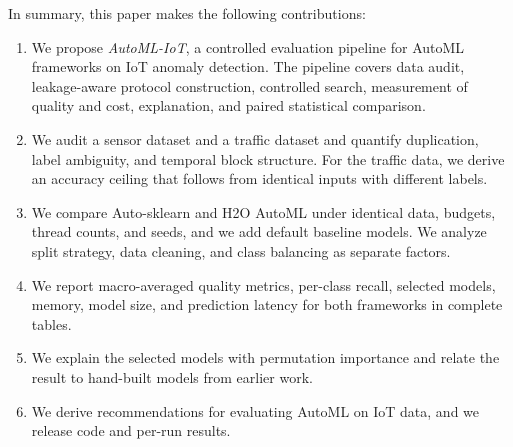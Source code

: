In summary, this paper makes the following contributions:
\begin{enumerate}
\item[(1)] We propose \emph{AutoML-IoT}, a controlled evaluation pipeline for AutoML frameworks on IoT anomaly detection. The pipeline covers data audit, leakage-aware protocol construction, controlled search, measurement of quality and cost, explanation, and paired statistical comparison.
\item[(2)] We audit a sensor dataset and a traffic dataset and quantify duplication, label ambiguity, and temporal block structure. For the traffic data, we derive an accuracy ceiling that follows from identical inputs with different labels.
\item[(3)] We compare Auto-sklearn and H2O AutoML under identical data, budgets, thread counts, and seeds, and we add default baseline models. We analyze split strategy, data cleaning, and class balancing as separate factors.
\item[(4)] We report macro-averaged quality metrics, per-class recall, selected models, memory, model size, and prediction latency for both frameworks in complete tables.
\item[(5)] We explain the selected models with permutation importance and relate the result to hand-built models from earlier work.
\item[(6)] We derive recommendations for evaluating AutoML on IoT data, and we release code and per-run results.
\end{enumerate}
